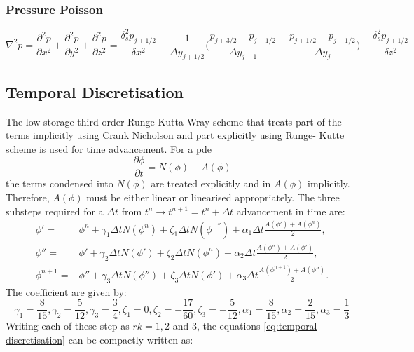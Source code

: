 \documentclass[preprint,12pt]{article}
\begin{document}
\subsubsection{Pressure Poisson}
\begin{equation}
\nabla^2 p=\frac{\partial^2 p}{\partial x^2}+\frac{\partial^2 p}{\partial y^2}+\frac{\partial^2p}{\partial z^2}=\frac{\delta_s^2 p_{j+1/2}}{\delta x^2}+\frac{1}{\Delta y_{j+1/2}}\Big(\frac{p_{j+3/2}-p_{j+1/2}}{\Delta y_{j+1}}-\frac{p_{j+1/2}-p_{j-1/2}}{\Delta y_{j}}\Big)+\frac{\delta_s^2 p_{j+1/2}}{\delta z^2}
\end{equation}

\subsection{Temporal Discretisation}
The low storage third order Runge-Kutta Wray scheme that treats part of the terms implicitly using Crank Nicholson and part explicitly using Runge- Kutte scheme is used for time advancement. For a pde
\begin{equation}
\frac{\partial \phi}{\partial t}=N(\phi)+A(\phi)
\end{equation}
the terms condensed into $N(\phi)$ are treated explicitly and in $A(\phi)$ implicitly. Therefore, $A(\phi)$ must be either linear or linearised appropriately. 
The three substeps required for a $\Delta t$ from $t^n\rightarrow t^{n+1}=t^n+\Delta t$ advancement in time are:
\begin{subequations}\label{eq:temporal discretisation}\begin{align}
\phi'=&\phi^n+\gamma_1 \Delta t N(\phi^n)+\zeta_1 \Delta t N(\phi^{-''})+\alpha_1\Delta t\frac{A(\phi')+A(\phi^n)}{2},\\
\phi''=&\phi'+\gamma_2 \Delta t N(\phi')+\zeta_2 \Delta t N(\phi^{n})+\alpha_2\Delta t\frac{A(\phi'')+A(\phi')}{2},\\
\phi^{n+1}=&\phi''+\gamma_3 \Delta t N(\phi'')+\zeta_3 \Delta t N(\phi')+\alpha_3\Delta t\frac{A(\phi^{n+1})+A(\phi'')}{2}.
\end{align}\end{subequations}
The coefficient are given by:
\begin{equation}
\gamma_1=\frac{8}{15}, \gamma_2=\frac{5}{12}, \gamma_3=\frac{3}{4}, \zeta_1=0, \zeta_2=-\frac{17}{60}, \zeta_3=-\frac{5}{12}, \alpha_1=\frac{8}{15}, \alpha_2=\frac{2}{15}, \alpha_3=\frac{1}{3}
\end{equation}
Writing each of these step as $rk=1,2$ and 3, the equations \eqref{eq:temporal discretisation} can be compactly written as:
\end{document}

